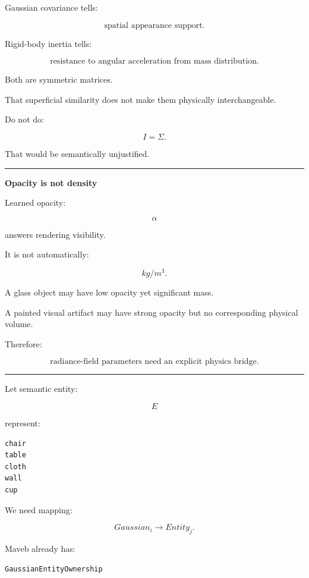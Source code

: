 Gaussian covariance tells:

\[
\boxed{
\text{spatial appearance support}.
}
\]

Rigid-body inertia tells:

\[
\boxed{
\text{resistance to angular acceleration from mass distribution}.
}
\]

Both are symmetric matrices.

That superficial similarity does not make them physically interchangeable.

Do not do:

\[
I=\Sigma.
\]

That would be semantically unjustified.

\begin{center}\rule{0.5\linewidth}{0.5pt}\end{center}

\textbf{Opacity is not density}

Learned opacity:

\[
\alpha
\]

answers rendering visibility.

It is not automatically:

\[
kg/m^3.
\]

A glass object may have low opacity yet significant mass.

A painted visual artifact may have strong opacity but no corresponding physical volume.

Therefore:

\[
\boxed{
\text{radiance-field parameters need an explicit physics bridge}.
}
\]

\begin{center}\rule{0.5\linewidth}{0.5pt}\end{center}

Let semantic entity:

\[
E
\]

represent:

\protect{}\label{f0n5qg}%
\begin{verbatim}
chair
table
cloth
wall
cup
\end{verbatim}

We need mapping:

\[
\boxed{
Gaussian_i
\rightarrow
Entity_j.
}
\]

Maveb already has:

\begin{verbatim}
GaussianEntityOwnership
\end{verbatim}

